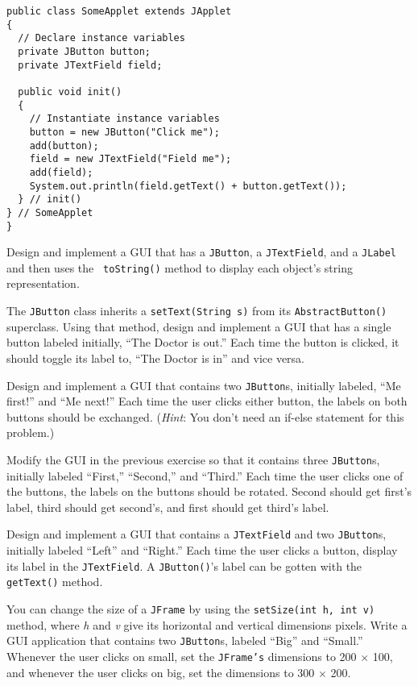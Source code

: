 \begin{EXRtwo}
\begin{jjjlisting}
\begin{lstlisting}
public class SomeApplet extends JApplet
{
  // Declare instance variables
  private JButton button;
  private JTextField field;

  public void init()
  { 
    // Instantiate instance variables
    button = new JButton("Click me");
    add(button);
    field = new JTextField("Field me");
    add(field);
    System.out.println(field.getText() + button.getText());
  } // init()
} // SomeApplet
}
\end{lstlisting}
\end{jjjlisting}
\item  Design and implement a GUI that has a {\tt JButton}, a 
{\tt JTextField}, and a {\tt JLabel} and then uses the {\tt
toString()} method to display each object's string representation.

\item  The {\tt JButton} class inherits a {\tt setText(String s)} 
from its {\tt AbstractButton()} superclass. Using that method, design
and implement a GUI that has a single button labeled initially, ``The
Doctor is out.''  Each time the button is clicked, it should toggle
its label to, ``The Doctor is in'' and vice versa.

\item  Design and implement a GUI that contains
two {\tt JButton}s, initially labeled, ``Me first!'' and ``Me next!''
Each time the user clicks either button, the labels on both buttons
should be exchanged.  ({\it Hint}: You don't need an if-else statement
for this problem.)

\item  Modify the GUI in the previous exercise so that it contains
three {\tt JButton}s, initially labeled ``First,'' ``Second,'' and
``Third.'' Each time the user clicks one of the buttons, the labels
on the buttons should be rotated.  Second should get first's label,
third should get second's, and first should get third's label.

\item  Design and implement a GUI that contains a
{\tt JTextField} and two {\tt JButton}s, initially labeled ``Left''
and ``Right.'' Each time the user clicks a button, display its
label in the {\tt JTextField}. A {\tt JButton()}'s label can be gotten
with the {\tt getText()} method.

\item  You can change the size of a {\tt JFrame} by using the
{\tt setSize(int h, int v)} method, where {\it h} and {\it v} give its horizontal and vertical
dimensions pixels.  Write a GUI application that 
contains two {\tt JButton}s, labeled ``Big'' and ``Small.'' Whenever
the user clicks on small, set the {\tt JFrame's} dimensions to
200 $\times$ 100, and whenever the user clicks on big, set the dimensions
to 300 $\times$ 200.


\end{EXRtwo}
